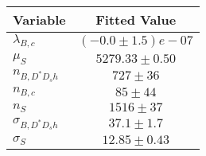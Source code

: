 \begin{tabular}[t]{lc}
\hline
Variable &Fitted Value\\
\hline\hline
$\lambda_{B,c}$&$(-0.0\pm1.5)e-07$\\
\hline
$\mu_S$&$5279.33\pm0.50$\\
\hline
$n_{B, D^* D_s h}$&$727\pm36$\\
\hline
$n_{B,c}$&$85\pm44$\\
\hline
$n_S$&$1516\pm37$\\
\hline
$\sigma_{B, D^* D_s h}$&$37.1\pm1.7$\\
\hline
$\sigma_S$&$12.85\pm0.43$\\
\hline
\end{tabular}